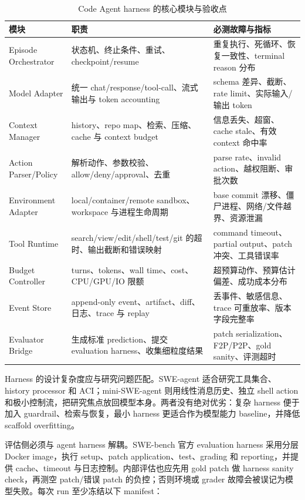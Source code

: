 \documentclass[10pt,a4paper,UTF8,fontset=none]{ctexart}
\begin{document}
\begin{table}[htbp]
\centering
\caption{Code Agent harness 的核心模块与验收点}
\label{tab:harness}
\small
\begin{tabularx}{\textwidth}{p{2.8cm}YY}
\toprule
模块 & 职责 & 必测故障与指标 \\
\midrule
Episode Orchestrator & 状态机、终止条件、重试、checkpoint/resume & 重复执行、死循环、恢复一致性、terminal reason 分布 \\
Model Adapter & 统一 chat/response/tool-call、流式输出与 token accounting & schema 差异、截断、rate limit、实际输入/输出 token \\
Context Manager & history、repo map、检索、压缩、cache 与 context budget & 信息丢失、超窗、cache stale、有效 context 命中率 \\
Action Parser/Policy & 解析动作、参数校验、allow/deny/approval、去重 & parse rate、invalid action、越权阻断、审批次数 \\
Environment Adapter & local/container/remote sandbox、workspace 与进程生命周期 & base commit 漂移、僵尸进程、网络/文件越界、资源泄漏 \\
Tool Runtime & search/view/edit/shell/test/git 的超时、输出截断和错误映射 & command timeout、partial output、patch 冲突、工具错误率 \\
Budget Controller & turns、tokens、wall time、cost、CPU/GPU/IO 限额 & 超预算动作、预算估计偏差、成功成本分布 \\
Event Store & append-only event、artifact、diff、日志、trace 与 replay & 丢事件、敏感信息、trace 可重放率、版本字段完整率 \\
Evaluator Bridge & 生成标准 prediction、提交 evaluation harness、收集细粒度结果 & patch serialization、F2P/P2P、gold sanity、评测超时 \\
\bottomrule
\end{tabularx}
\end{table}

Harness 的设计复杂度应与研究问题匹配。SWE-agent 适合研究工具集合、history processor 和 ACI；mini-SWE-agent 则用线性消息历史、独立 shell action 和极小控制流，把研究焦点放回模型本身\cite{minisweagent2026}。两者没有绝对优劣：复杂 harness 便于加入 guardrail、检索与恢复，最小 harness 更适合作为模型能力 baseline，并降低 scaffold overfitting。

评估侧必须与 agent harness 解耦。SWE-bench 官方 evaluation harness 采用分层 Docker image，执行 setup、patch application、test、grading 和 reporting，并提供 cache、timeout 与日志控制\cite{swebenchharness2026}。内部评估也应先用 gold patch 做 harness sanity check，再测空 patch/错误 patch 的负控；否则环境或 grader 故障会被误记为模型失败。每次 run 至少冻结以下 manifest：
\end{document}
